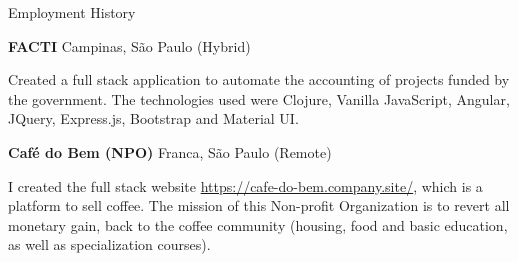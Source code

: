 \begin{rubric}{Employment History}




%
%
%
\textbf{FACTI} Campinas, São Paulo (Hybrid)
\par Created a full stack application to automate the accounting of projects funded by the government. The technologies used were Clojure, Vanilla JavaScript, Angular, JQuery, Express.js, Bootstrap and Material UI.

\textbf{Café do Bem (NPO)} Franca, São Paulo (Remote)
\par I created the full stack website \href{https://cafe-do-bem.company.site/}{https://cafe-do-bem.company.site/}, which is a platform to sell coffee. The mission of this Non-profit Organization is to revert all monetary gain, back to the coffee community (housing, food and basic education, as well as specialization courses).


\end{rubric}
